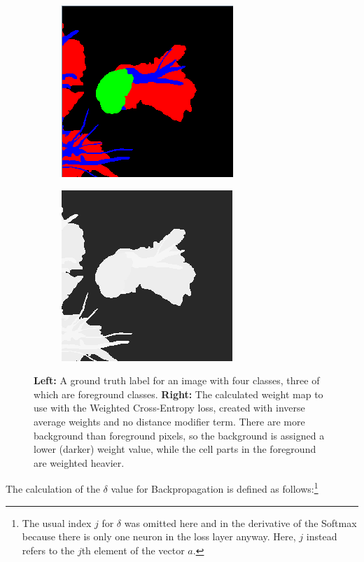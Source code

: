 \begin {figure}[!ht]
	\begin{center}
	\begin {subfigure}[b]{0.3\linewidth}
		\includegraphics{img/fig_weights_normal.png}
	\end {subfigure}\hspace{2.5cm}
	\begin {subfigure}[b]{0.3\linewidth}
		\includegraphics{img/fig_weights_weightmap.png}
	\end {subfigure}
	\end{center}

		\caption[The Cross-Entropy Loss weight map.]{\textbf{Left:} A ground truth label for an image with four classes, three of which are foreground classes. \textbf{Right:} The calculated weight map to use with the Weighted Cross-Entropy loss, created with inverse average weights and no distance modifier term. There are more background than foreground pixels, so the background is assigned a lower (darker) weight value, while the cell parts in the foreground are weighted heavier.}
		\label{fig:weight_map}

\end {figure}

\noindent The calculation of the $\delta$ value for Backpropagation is defined as follows:\footnote{The usual index $j$ for $\delta$ was omitted here and in the derivative of the Softmax because there is only one neuron in the loss layer anyway. Here, $j$ instead refers to the $j$th element of the vector $a$.} \\


